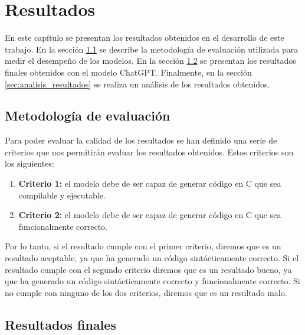 \chapter{Resultados}
\label{cap:resultados}


En este capítulo se presentan los resultados obtenidos en el desarrollo de este trabajo. 
En la sección \ref{sec:evaluacion} se describe la metodología de evaluación utilizada 
para medir el desempeño de los modelos. En la sección \ref{sec:resultados_finales} se
presentan los resultados finales obtenidos con el modelo ChatGPT. Finalmente, en la
sección \ref{sec:analisis_resultados} se realiza un análisis de los resultados obtenidos.

\section{Metodología de evaluación}
\label{sec:evaluacion}


Para poder evaluar la calidad de los resultados se han definido una serie de criterios que
nos permitirán evaluar los resultados obtenidos. Estos criterios son los siguientes:

\begin{enumerate}
    \item \textbf{Criterio 1:} el modelo debe de ser capaz de generar código en C que sea
        compilable y ejecutable.
    \item \textbf{Criterio 2:} el modelo debe de ser capaz de generar código en C que sea
        funcionalmente correcto.
\end{enumerate}

Por lo tanto, si el resultado cumple con el primer criterio, diremos que es un resultado aceptable,
ya que ha generado un código sintácticamente correcto. Si el resultado cumple con el segundo criterio
diremos que es un resultado bueno, ya que ha generado un código sintácticamente correcto y funcionalmente
correcto. Si no cumple con ninguno de los dos criterios, diremos que es un resultado malo.

\section{Resultados finales}
\label{sec:resultados_finales}

